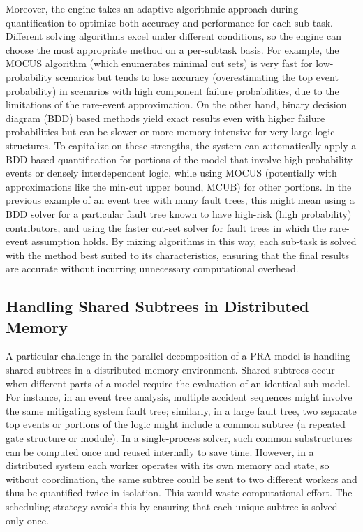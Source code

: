 Moreover, the engine takes an adaptive algorithmic approach during quantification to optimize both accuracy and performance for each sub-task. Different solving algorithms excel under different conditions, so the engine can choose the most appropriate method on a per-subtask basis. For example, the MOCUS algorithm (which enumerates minimal cut sets) is very fast for low-probability scenarios but tends to lose accuracy (overestimating the top event probability) in scenarios with high component failure probabilities, due to the limitations of the rare-event approximation. On the other hand, binary decision diagram (BDD) based methods yield exact results even with higher failure probabilities but can be slower or more memory-intensive for very large logic structures. To capitalize on these strengths, the system can automatically apply a BDD-based quantification for portions of the model that involve high probability events or densely interdependent logic, while using MOCUS (potentially with approximations like the min-cut upper bound, MCUB) for other portions. In the previous example of an event tree with many fault trees, this might mean using a BDD solver for a particular fault tree known to have high-risk (high probability) contributors, and using the faster cut-set solver for fault trees in which the rare-event assumption holds. By mixing algorithms in this way, each sub-task is solved with the method best suited to its characteristics, ensuring that the final results are accurate without incurring unnecessary computational overhead.

\subsection{Handling Shared Subtrees in Distributed Memory} A particular challenge in the parallel decomposition of a PRA model is handling shared subtrees in a distributed memory environment. Shared subtrees occur when different parts of a model require the evaluation of an identical sub-model. For instance, in an event tree analysis, multiple accident sequences might involve the same mitigating system fault tree; similarly, in a large fault tree, two separate top events or portions of the logic might include a common subtree (a repeated gate structure or module). In a single-process solver, such common substructures can be computed once and reused internally to save time. However, in a distributed system each worker operates with its own memory and state, so without coordination, the same subtree could be sent to two different workers and thus be quantified twice in isolation. This would waste computational effort. The scheduling strategy avoids this by ensuring that each unique subtree is solved only once.


